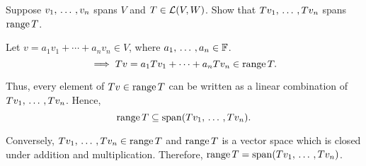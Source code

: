 \begin{xrcs}
  Suppose $v_1, {\, \ldots \,\,}, v_n$ spans $V$ and $T \in \mathcal{L}(V,W)$. Show that $Tv_1, {\, \ldots \,\,}, Tv_n$ spans $\operatorname{range} T$.

  \begin{xprf}
    Let $v = a_1 v_1 + \cdots + a_n v_n \in V$, where $a_1, {\, \ldots \,\,}, a_n \in \mathbb{F}$.
    \begin{equation}
      \implies Tv = a_1 T v_1 + \cdots + a_n T v_n \in \operatorname{range} T.
    \end{equation}

    Thus, every element of $Tv \in \operatorname{range} T$ can be written as a linear combination of $Tv_1, {\, \ldots \,\,}, Tv_n$. Hence,
    \begin{equation}
      \operatorname{range} T \subseteq \operatorname{span} (T v_1, {\, \ldots \,\,}, T v_n).
    \end{equation}

    Conversely, \( Tv_1, {\, \ldots \,\,}, Tv_n \in \operatorname{range} T \) and $\operatorname{range} T$ is a vector space which is closed under addition and multiplication. Therefore, $\operatorname{range} T = \operatorname{span} (Tv_1, {\, \ldots \,\,}, Tv_n)$.
  \end{xprf}
\end{xrcs}


